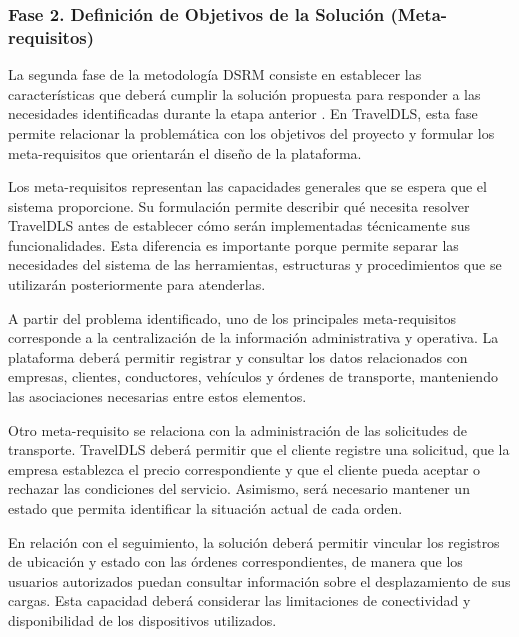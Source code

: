 
\subsubsection{Fase 2. Definición de Objetivos de la Solución (Meta-requisitos)}
\label{sec:metodo-fase2}

La segunda fase de la metodología DSRM consiste en establecer las características que deberá cumplir la solución propuesta para responder a las necesidades identificadas durante la etapa anterior \parencite{peffers2007dsrm}. En TravelDLS, esta fase permite relacionar la problemática con los objetivos del proyecto y formular los meta-requisitos que orientarán el diseño de la plataforma.

Los meta-requisitos representan las capacidades generales que se espera que el sistema proporcione. Su formulación permite describir qué necesita resolver TravelDLS antes de establecer cómo serán implementadas técnicamente sus funcionalidades. Esta diferencia es importante porque permite separar las necesidades del sistema de las herramientas, estructuras y procedimientos que se utilizarán posteriormente para atenderlas.

A partir del problema identificado, uno de los principales meta-requisitos corresponde a la centralización de la información administrativa y operativa. La plataforma deberá permitir registrar y consultar los datos relacionados con empresas, clientes, conductores, vehículos y órdenes de transporte, manteniendo las asociaciones necesarias entre estos elementos.

Otro meta-requisito se relaciona con la administración de las solicitudes de transporte. TravelDLS deberá permitir que el cliente registre una solicitud, que la empresa establezca el precio correspondiente y que el cliente pueda aceptar o rechazar las condiciones del servicio. Asimismo, será necesario mantener un estado que permita identificar la situación actual de cada orden.

En relación con el seguimiento, la solución deberá permitir vincular los registros de ubicación y estado con las órdenes correspondientes, de manera que los usuarios autorizados puedan consultar información sobre el desplazamiento de sus cargas. Esta capacidad deberá considerar las limitaciones de conectividad y disponibilidad de los dispositivos utilizados.

